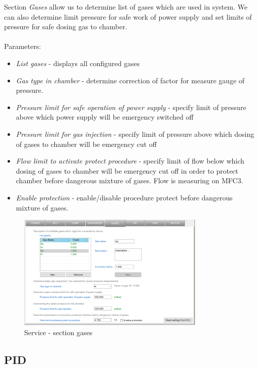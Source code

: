 Section \textit{Gases} allow us to determine list of gases which are used in system. We can also determine limit pressure for safe work of power supply and set limits of pressure for safe dosing gas to chamber.\\\\
Parameters:\\
\begin{itemize}
	\item  \textit{List gases} - displays all configured gases
	\item  \textit{Gas type in chamber} - determine correction of factor for measure gauge of pressure. 
	\item  \textit{Pressure limit for safe operation of power supply} - specify limit of pressure above which power supply will be emergency switched off
	\item  \textit{Pressure limit for gas injection} - specify limit of pressure above which dosing of gases to chamber will be emergency cut off
	\item  \textit{Flow limit to activate protect procedure} - specify limit of flow below which dosing of gases to chamber will be emergency cut off in order to protect chamber before dangerous mixture of gases. Flow is measuring on MFC3.
	\item  \textit{Enable protection} - enable/disable procedure protect before dangerous mixture of gases.
\end{itemize}

	\begin{figure}[!h] 
	\centering \includegraphics[width=0.8\textwidth]{Graphic/Service/Gases.png}	
	\caption{Service - section gases}
	\label{alerts_window}
	\end{figure}
	\FloatBarrier

\subsection{PID}

